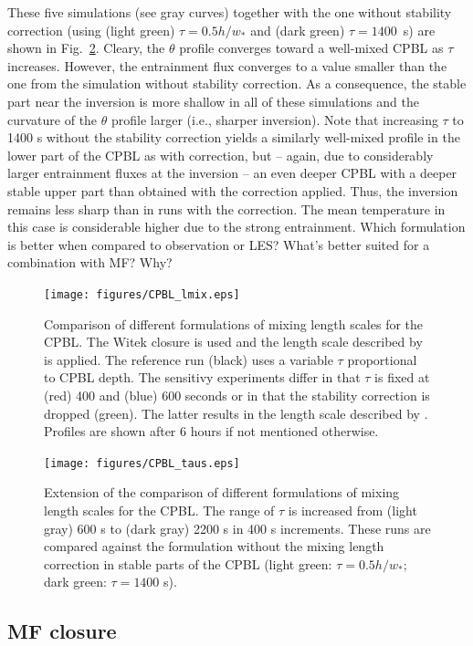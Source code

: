 \documentclass[dvipdfmx,a4paper,10pt]{article}
\begin{document}
These five simulations (see gray curves) together with the one without stability correction (using (light green) $\tau=0.5h/w_*$ and (dark green) $\tau=1400$~s) are shown in Fig.~\ref{fig:taus}.  Cleary, the $\theta$ profile converges toward a well-mixed CPBL as $\tau$ increases. However, the entrainment flux converges to a value smaller than the one from the simulation without stability correction. As a consequence, the stable part near the inversion is more shallow in all of these simulations and the curvature of the $\theta$ profile larger (i.e., sharper inversion). Note that increasing $\tau$ to 1400 s without the stability correction yields a similarly well-mixed profile in the lower part of the CPBL as with correction, but -- again, due to considerably larger entrainment fluxes at the inversion -- an even deeper CPBL with a deeper stable upper part than obtained with the correction applied. Thus, the inversion remains less sharp than in runs with the correction. The mean temperature in this case is considerable higher due to the strong entrainment.  {\color{blue} Which formulation is better when compared to observation or LES? What's better suited for a combination with MF? Why?}

\begin{figure}[bthp]
\centering
 \texttt{[image: figures/CPBL\_lmix.eps]}
\caption{Comparison of different formulations of mixing length scales for the CPBL. The Witek closure is used and the length scale described by \cite{suselj13} is applied. The reference run (black) uses a variable $\tau$ proportional to CPBL depth. The sensitivy experiments differ in that $\tau$ is fixed at (red) 400 and (blue) 600 seconds or in that the stability correction is dropped (green). The latter results in the length scale described by \cite{teixeira04}. Profiles are shown after 6 hours if not mentioned otherwise.} \label{fig:lmix}
\end{figure}
\begin{figure}[bthp]
\centering
 \texttt{[image: figures/CPBL\_taus.eps]}
\caption{Extension of the comparison of different formulations of mixing length scales for the CPBL. The range of $\tau$ is increased from (light gray) 600 s to (dark gray) 2200 s in 400 s increments. These runs are compared against the formulation without the mixing length correction in stable parts of the CPBL (light green: $\tau=0.5h/w_*$; dark green: $\tau=1400$ s).} \label{fig:taus}
\end{figure}

\subsection{MF closure}
\end{document}
